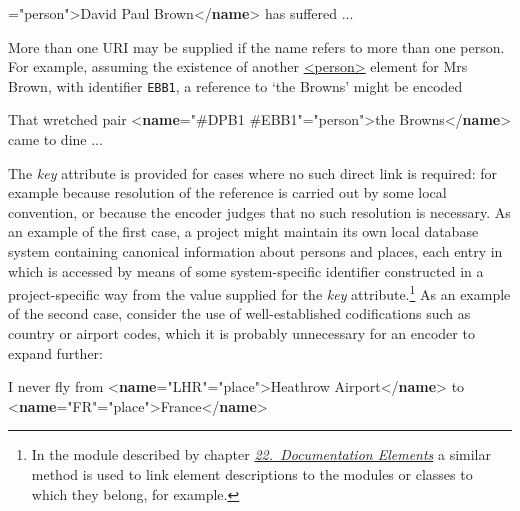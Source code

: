 \begin{shaded}
{\hspace*{1em}{type}="{person}">}David Paul Brown{</\textbf{name}>} has suffered ...\end{shaded}\egroup\par \noindent More than one URI may be supplied if the name refers to more than one person. For example, assuming the existence of another \hyperref[TEI.person]{<person>} element for Mrs Brown, with identifier \texttt{EBB1}, a reference to ‘the Browns’ might be encoded \par\bgroup{}\exampleFont \begin{shaded}\noindent\mbox{}That wretched pair {<\textbf{name}\hspace*{1em}{ref}="{\#DPB1 \#EBB1}"\hspace*{1em}{type}="{person}">}the Browns{</\textbf{name}>} came\mbox{}\newline 
 to dine ...\end{shaded}\egroup\par \par
The {\itshape key} attribute is provided for cases where no such direct link is required: for example because resolution of the reference is carried out by some local convention, or because the encoder judges that no such resolution is necessary. As an example of the first case, a project might maintain its own local database system containing canonical information about persons and places, each entry in which is accessed by means of some system-specific identifier constructed in a project-specific way from the value supplied for the {\itshape key} attribute.\footnote{In the module described by chapter \textit{\hyperref[TD]{22.\ Documentation Elements}} a similar method is used to link element descriptions to the modules or classes to which they belong, for example.} As an example of the second case, consider the use of well-established codifications such as country or airport codes, which it is probably unnecessary for an encoder to expand further: \par\bgroup{}\exampleFont \begin{shaded}\noindent\mbox{} I never fly from {<\textbf{name}\hspace*{1em}{key}="{LHR}"\hspace*{1em}{type}="{place}">}Heathrow Airport{</\textbf{name}>} to \mbox{}\newline 
{<\textbf{name}\hspace*{1em}{key}="{FR}"\hspace*{1em}{type}="{place}">}France{</\textbf{name}>}\end{shaded}\egroup\par \par
